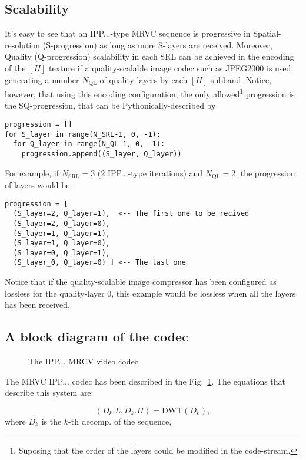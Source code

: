 \subsection{Scalability}
It's easy to see that an IPP...-type MRVC sequence is progressive in
Spatial-resolution (S-progression) as long as more S-layers are
received. Moreover, Quality (Q-progression) scalability in each SRL
can be achieved in the encoding of the $[H]$ texture if a
quality-scalable image codec such as JPEG2000 is used, generating a
number $N_{\text{QL}}$ of quality-layers by each $[H]$
subband. Notice, however, that using this encoding configuration, the
only allowed\footnote{Suposing that the order of the layers could be
modified in the code-stream.} progression is the SQ-progression, that
can be Pythonically-described by
\begin{verbatim}
progression = []
for S_layer in range(N_SRL-1, 0, -1):
  for Q_layer in range(N_QL-1, 0, -1):
    progression.append((S_layer, Q_layer))
\end{verbatim}

For example, if $N_{\text{SRL}}=3$ (2 IPP...-type iterations) and
$N_{\text{QL}}=2$, the progression of layers would be:
\begin{verbatim}
progression = [
  (S_layer=2, Q_layer=1),  <-- The first one to be recived
  (S_layer=2, Q_layer=0),
  (S_layer=1, Q_layer=1),
  (S_layer=1, Q_layer=0),
  (S_layer=0, Q_layer=1),
  (S_layer_0, Q_layer=0) ] <-- The last one
\end{verbatim}
Notice that if the quality-scalable image compressor has been
configured as lossless for the quality-layer 0, this example
would be lossless when all the layers has been received.

\subsection{A block diagram of the codec}
\begin{figure}
  \centering
  \caption{The IPP... MRCV video codec.}
  \label{fig:codec}
\end{figure}

The MRVC IPP... codec has been described in the
Fig.~\ref{fig:codec}. The equations that describe this system are:

\begin{equation}
  (D_k.L, D_k.H) = \text{DWT}(D_k),
  \tag{a}
\end{equation}
where $D_k$ is the $k$-th decomp. of the sequence,

